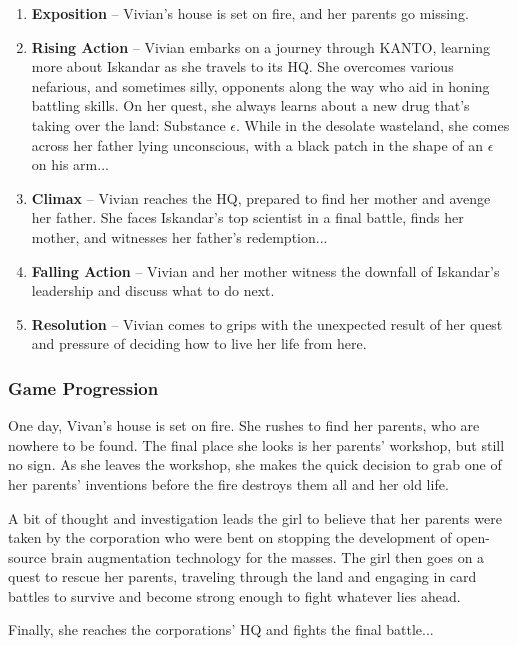 \documentclass[12pt,titlepage]{article}
\newcommand\evilcorp{Iskandar\xspace}
\newcommand\world{KANTO\xspace}
\begin{document}
\begin{enumerate}
    \item {\bf Exposition} -- Vivian's house is set on fire, and her parents go
    missing.
    \item {\bf Rising Action} -- Vivian embarks on a journey through \world,
    learning more about \evilcorp as she travels to its HQ. She overcomes
    various nefarious, and sometimes silly, opponents along the way who aid in
    honing battling skills. On her quest, she always learns about a new drug
    that's taking over the land: Substance $\epsilon$. While in the desolate
    wasteland, she comes across her father lying unconscious, with a black patch
    in the shape of an $\epsilon$ on his arm...
    \item {\bf Climax} -- Vivian reaches the HQ, prepared to find her mother and
    avenge her father. She faces \evilcorp's top scientist in a final battle,
    finds her mother, and witnesses her father's redemption...
    \item {\bf Falling Action} -- Vivian and her mother witness the downfall of
    \evilcorp's leadership and discuss what to do next.
    \item {\bf Resolution} -- Vivian comes to grips with the unexpected
    result of her quest and pressure of deciding how to live her life from here.
\end{enumerate}

\subsubsection{Game Progression}

One day, Vivan's house is set on fire. She rushes to find her parents, who are
nowhere to be found. The final place she looks is her parents' workshop, but
still no sign. As she leaves the workshop, she makes the quick decision to grab
one of her parents' inventions before the fire destroys them all and her old
life.

A bit of thought and investigation leads the girl to believe that her parents
were taken by the corporation who were bent on stopping the development of
open-source brain augmentation technology for the masses. The girl then goes on
a quest to rescue her parents, traveling through the land and engaging in card
battles to survive and become strong enough to fight whatever lies ahead.

Finally, she reaches the corporations' HQ and fights the final battle...
\end{document}
